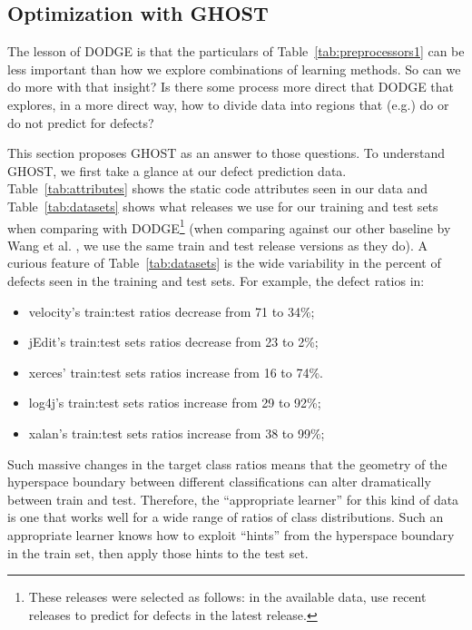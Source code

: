 \documentclass[10pt,compsoc,twocolumn]{IEEEtran}
\newcommand{\bi}{\begin{itemize}}
\newcommand{\ei}{\end{itemize}}
\newcommand{\respto}[1]{
\fcolorbox{black}{black!15}{%
\label{resp:#1}%
\bf\scriptsize R{#1}}}
\begin{document}

\subsection{Optimization with GHOST \respto{3a2.1}}
The lesson of DODGE is that the particulars
of Table~\ref{tab:preprocessors1} can be
less important than how we explore combinations
of learning methods.   So can we do more with
that insight? Is there some process more
direct that DODGE that explores, in a
more direct way, how to divide data
into regions that (e.g.) do or do not
predict for defects?

This section proposes GHOST as an
answer to those questions. To understand
GHOST, we first take a glance at   our defect prediction data. Table~\ref{tab:attributes} shows
the static code attributes seen in our data
and Table~\ref{tab:datasets} shows what releases
we use for our training and test sets when comparing with DODGE\footnote{These releases were selected as follows: in the available data, use recent releases to predict for defects in the latest release.} (when comparing against our other baseline by Wang et al. \cite{wang2018deep}, we use the same train and test release versions as they do). A curious feature of    Table~\ref{tab:datasets} is the wide variability in the percent of defects seen in the training and test sets. For example, the defect ratios in: 
\bi
\item  velocity's  train:test ratios decrease from 71 to 34\%;
\item jEdit's train:test sets ratios decrease from  23 to 2\%;
\item xerces' train:test sets ratios increase from  16 to 74\%.
\item log4j's train:test sets ratios increase from  29 to 92\%;
\item xalan's train:test sets ratios increase from 38 to 99\%;
\ei
Such massive changes in the target class ratios means
that the geometry of the hyperspace boundary
between different classifications  
can alter dramatically between train and test.
Therefore, the ``appropriate
learner''   for
this kind of data is one that
works well for a wide range
of ratios
of class distributions.
Such an appropriate learner
knows how to exploit
``hints'' from the hyperspace boundary in the train
set, then apply those hints to the test set.
\end{document}

